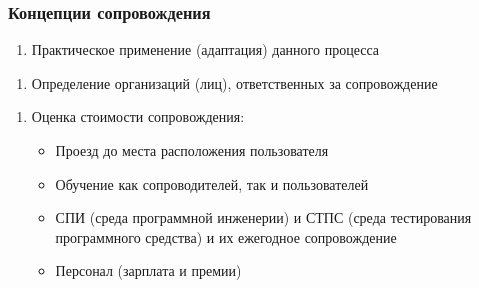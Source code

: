 \documentclass{../industrial-development}
\begin{document}
\begin{frame} \frametitle{Концепции сопровождения}
	\begin{enumerate}[2]
	\item Практическое применение (адаптация) данного процесса
	\end{enumerate}
	\begin{enumerate}[3]
	\item Определение организаций (лиц), ответственных за сопровождение
	\end{enumerate}
	\begin{enumerate}[4]
	\item Оценка стоимости сопровождения: 
		\begin{itemize}
		\item Проезд до места расположения пользователя 
		\item Обучение как сопроводителей, так и пользователей
		\item СПИ (среда программной инженерии) и СТПС (среда тестирования программного средства) и их ежегодное сопровождение
		\item Персонал (зарплата и премии) 
		\end{itemize}
	\end{enumerate}
\end{frame}
\end{document}
